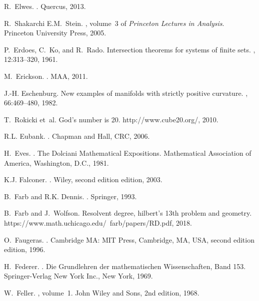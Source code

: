 \documentclass[12pt]{amsart}
\newcounter{example}    \def\example#1{ \item \fontsize{12}{15} \selectfont #1 \fontsize{12}{15} \selectfont }
\begin{document}
\begin{thebibliography}{100}
R.~Elwes.
.
\newblock Quercus, 2013.

R.~Shakarchi E.M.~Stein.
,
  volume~3 of {\em Princeton Lectures in Analysis}.
\newblock Princeton University Press, 2005.

P.~Erdoes, C.~Ko, and R.~Rado.
\newblock Intersection theorems for systems of finite sets.
, 12:313--320, 1961.

M.~Erickson.
.
\newblock MAA, 2011.

J.-H. Eschenburg.
\newblock New examples of manifolds with strictly positive curvature.
, 66:469--480, 1982.

T.~Rokicki et~al.
\newblock God's number is 20.
\newblock http://www.cube20.org/, 2010.

R.L. Eubank.
.
\newblock Chapman and Hall, CRC, 2006.

H.~Eves.
.
\newblock The Dolciani Mathematical Expositions. Mathematical Association of
  America, Washington, D.C., 1981.

K.J. Falconer.
.
\newblock Wiley, second edition edition, 2003.

B.~Farb and R.K. Dennis.
.
\newblock Springer, 1993.

B.~Farb and J.~Wolfson.
\newblock Resolvent degree, hilbert's 13th problem and geometry.
\newblock https://www.math.uchicago.edu/~farb/papers/RD.pdf, 2018.

O.~Faugeras.
.
\newblock Cambridge MA: MIT Press, Cambridge, MA, USA, second edition edition,
  1996.

H.~Federer.
.
\newblock Die Grundlehren der mathematischen Wissenschaften, Band 153.
  Springer-Verlag New York Inc., New York, 1969.

W.~Feller.
,
  volume~1.
\newblock John Wiley and Sons, 2nd edition, 1968.


\end{thebibliography}
\end{document}

